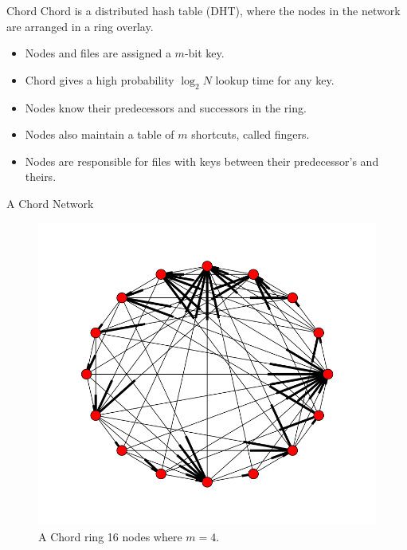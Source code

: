 \documentclass[11pt]{beamer}
\begin{document}
\begin{frame}{Chord}
Chord is a distributed hash table (DHT), where the nodes in the network are arranged in a ring overlay.
\begin{itemize}
	\item Nodes and files are assigned a $m$-bit key.
	\item Chord gives a high probability $\log_{2} N$ lookup time for any key.
	\item Nodes know their predecessors and successors in the ring.
	\item Nodes also maintain a table of $m$ shortcuts, called fingers.
	\item Nodes are responsible for files with keys between their predecessor's and theirs.
\end{itemize}


\end{frame}

\begin{frame}{A Chord Network}
\begin{figure}
    \includegraphics[width=0.6\linewidth]{chordreal}
    \caption{A Chord ring 16 nodes where $m=4$.}
    \label{chordreal}
\end{figure}
\end{frame}
\end{document}
